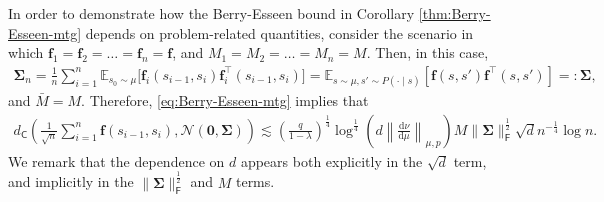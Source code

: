 In order to demonstrate how the Berry-Esseen bound in Corollary \ref{thm:Berry-Esseen-mtg} depends on problem-related quantities, consider the scenario in which 
$\bm{f}_1 = \bm{f}_2 = \ldots = \bm{f}_n = \bm{f}$, and $M_1 = M_2 = \ldots = M_n = M$. Then, in this case,
\begin{align*}
\bm{\Sigma}_n = \frac{1}{n} \sum_{i=1}^n \mathbb{E}_{s_0 \sim \mu}\Big[\bm{f}_i(s_{i-1},s_i)\bm{f}_i^\top(s_{i-1},s_i)\Big] = \mathbb{E}_{s \sim \mu, s' \sim P(\cdot \mid s)}[\bm{f}(s,s')\bm{f}^\top(s,s')] =: \bm{\Sigma},
\end{align*}
and $\bar{M} = M$. Therefore, \eqref{eq:Berry-Esseen-mtg} implies that
\begin{align*}
d_{\mathsf{C}}\left(\frac{1}{\sqrt{n}}\sum_{i=1}^n \bm{f}(s_{i-1}, s_i), \mathcal{N}(\bm{0},\bm{\Sigma})\right)  \lesssim \left(\frac{q}{1-\lambda}\right)^{\frac{1}{4}}\log^{\frac{1}{4}}\left(d\left\|\frac{\mathrm{d}\nu}{\mathrm{d}\mu}\right\|_{\mu,p}\right)M\|\bm{\Sigma}\|_{\mathsf{F}}^{\frac{1}{2}}\sqrt{d}n^{-\frac{1}{4}}\log n.
\end{align*}
We remark that the dependence on $d$ appears both explicitly in the $\sqrt{d}$ term, and implicitly in the $\|\bm{\Sigma}\|_{\mathsf{F}}^{\frac{1}{2}}$ and $M$ terms. 

